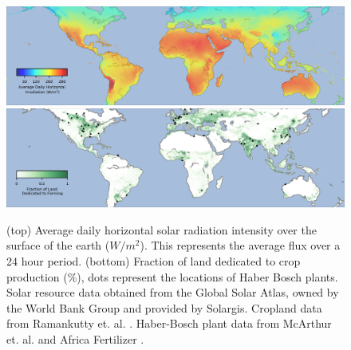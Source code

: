 
\begin{figure}
    \centering
    \includegraphics[width=1\textwidth]{Figures/solar_map.png}
    \includegraphics[width=1\textwidth]{Figures/croplands_map.png}
    \caption{(top) Average daily horizontal solar radiation intensity over the surface of the earth ($W/m^2$). This represents the average flux over a 24 hour period. (bottom) Fraction of land dedicated to crop production (\%), dots represent the locations of Haber Bosch plants. Solar resource data obtained from the Global Solar Atlas, owned by the World Bank Group and provided by Solargis. Cropland data from Ramankutty et. al. \cite{Ramankutty_2008, Ramankutty2010}. Haber-Bosch plant data from McArthur et. al.\cite{McArthur_2017} and Africa Fertilizer \cite{africafertilizer_2018}.} 
    
    
    \label{fig:usemap}
\end{figure}

